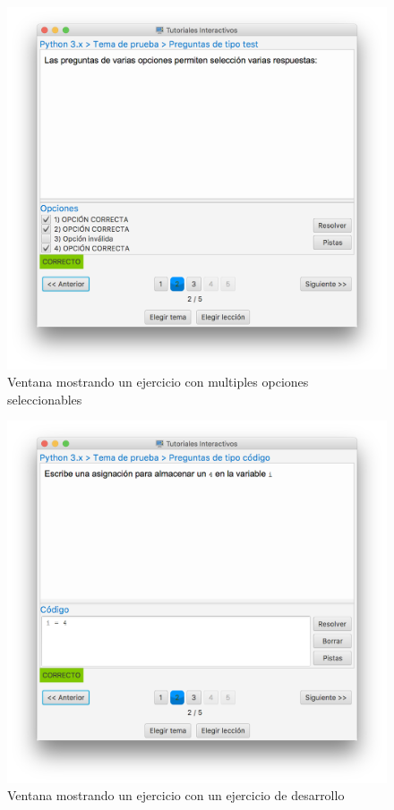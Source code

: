 \documentclass[]{article}
\begin{document}
%
\begin{figure}[tbp]
\begin{center}
\includegraphics[scale=0.35]{l_5.png}
\end{center}
\caption{Ventana mostrando un ejercicio con multiples opciones seleccionables\label{fig:l_5}}
\end{figure}
%

%
\begin{figure}[tbp]
\begin{center}
\includegraphics[scale=0.35]{l_6.png}
\end{center}
\caption{Ventana mostrando un ejercicio con un ejercicio de desarrollo\label{fig:l_6}}
\end{figure}
%
\end{document}
